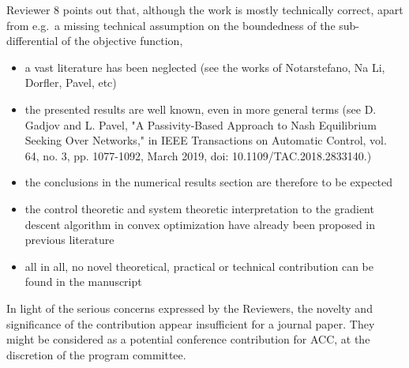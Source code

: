 Reviewer 8 points out that, although the work is mostly technically correct, apart from e.g.\ a missing technical assumption on the boundedness of the sub-differential of the objective function,
\vspace{-7pt}
\begin{itemize}[nosep]
    \item {%
        a vast literature has been neglected (see the works of Notarstefano, Na Li, Dorfler, Pavel, etc)
    }%
    \item{%
        the presented results are well known, even in more general terms (see D. Gadjov and L. Pavel, "A Passivity-Based Approach to Nash Equilibrium Seeking Over Networks," in IEEE Transactions on Automatic Control, vol. 64, no. 3, pp. 1077-1092, March 2019, doi: 10.1109/TAC.2018.2833140.)
    }%
    \item{%
        the conclusions in the numerical results section are therefore to be expected
    }%
    \item{%
        the control theoretic and system theoretic interpretation to the gradient descent algorithm in convex optimization have already been proposed in previous literature
    }%
    \item{%
        all in all, no novel theoretical, practical or technical contribution can be found in the manuscript
    }%
\end{itemize}

In light of the serious concerns expressed by the Reviewers, the novelty and significance of the contribution appear insufficient for a journal paper. They might be considered as a potential conference contribution for ACC, at the discretion of the program committee.